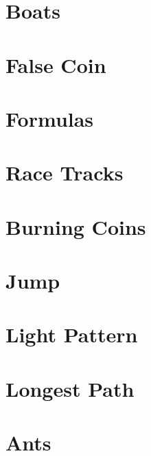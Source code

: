 \documentclass[a4paper, 10pt]{article}
\let\stdsection\section
\renewcommand\section{\newpage\stdsection}
\newcommand{\includecode}[1]{
    }
\begin{document}
    \section{Boats}
        \includecode{../problems/w02/Boats/Boats1.cpp}
        
    \section{False Coin}
        \includecode{../problems/w02/False_Coin/FalseCoin1.cpp}
        
    \section{Formulas}
        \includecode{../problems/w02/Formulas/Formulas1.cpp}
        
    \section{Race Tracks}
        \includecode{../problems/w02/Race_Tracks/RaceTracks1.cpp}

    
    \section{Burning Coins}
        \includecode{../problems/w03/Burning_Coins/BurningCoin1.cpp}
        
    \section{Jump}
        \includecode{../problems/w03/Jump/Jump1.cpp}
        
    \section{Light Pattern}
        \includecode{../problems/w03/Light_Pattern/LightPatterns1.cpp}
        
    \section{Longest Path}
        \includecode{../problems/w03/Longest_Path/LongestPath1.cpp}
        \includecode{../problems/w03/Longest_Path/LongestPathTraversal1.cpp}
             
              
    \section{Ants}
        \includecode{../problems/w04/Ants/Ants1.cpp}
        
\end{document}
